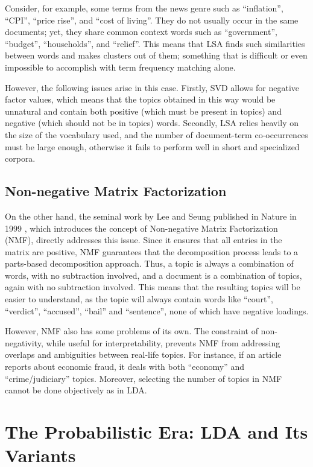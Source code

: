 Consider, for example, some terms from the news genre such as ``inflation'', ``CPI'', ``price rise'', and ``cost of living''. They do not usually occur in the same documents; yet, they share common context words such as ``government'', ``budget'', ``households'', and ``relief''. This means that LSA finds such similarities between words and makes clusters out of them; something that is difficult or even impossible to accomplish with term frequency matching alone.

However, the following issues arise in this case. Firstly, SVD allows for negative factor values, which means that the topics obtained in this way would be unnatural and contain both positive (which must be present in topics) and negative (which should not be in topics) words. Secondly, LSA relies heavily on the size of the vocabulary used, and the number of document-term co-occurrences must be large enough, otherwise it fails to perform well in short and specialized corpora.

\subsection{Non-negative Matrix Factorization}
On the other hand, the seminal work by Lee and Seung published in Nature in 1999 \cite{lee1999}, which introduces the concept of Non-negative Matrix Factorization (NMF), directly addresses this issue. Since it ensures that all entries in the matrix are positive, NMF guarantees that the decomposition process leads to a parts-based decomposition approach. Thus, a topic is always a combination of words, with no subtraction involved, and a document is a combination of topics, again with no subtraction involved. This means that the resulting topics will be easier to understand, as the topic will always contain words like ``court'', ``verdict'', ``accused'', ``bail'' and ``sentence'', none of which have negative loadings.

However, NMF also has some problems of its own. The constraint of non-negativity, while useful for interpretability, prevents NMF from addressing overlaps and ambiguities between real-life topics. For instance, if an article reports about economic fraud, it deals with both ``economy'' and ``crime/judiciary'' topics. Moreover, selecting the number of topics in NMF cannot be done objectively as in LDA.

\section{The Probabilistic Era: LDA and Its Variants}

